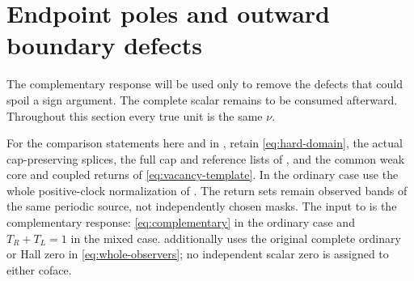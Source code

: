 \documentclass[11pt,a4paper]{amsart}
\numberwithin{equation}{section}
\theoremstyle{plain}
\theoremstyle{definition}
\begin{document}
\section{Endpoint poles and outward boundary defects}\label{sec:poles}

The complementary response will be used only to remove the defects that could spoil a sign argument.  The complete scalar remains to be consumed afterward.  Throughout this section every true unit is the same \(\nu\).

For the comparison statements here and in ,
retain \eqref{eq:hard-domain}, the actual cap-preserving splices,
the full cap and reference lists of , and the common
weak core and coupled returns of \eqref{eq:vacancy-template}.
In the ordinary case use the whole positive-clock normalization of
.  The return sets remain observed bands of the
same periodic source, not independently chosen masks.
The input to  is the complementary response:
\eqref{eq:complementary} in the ordinary case and \(T_R+T_L=1\)
in the mixed case.   additionally uses
the original complete ordinary or Hall zero in
\eqref{eq:whole-observers}; no independent scalar zero is assigned to
either coface.
\end{document}
